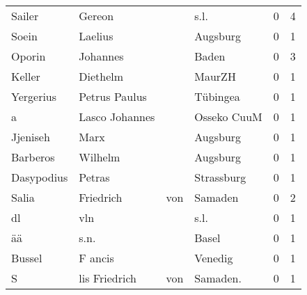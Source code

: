 \begin{center}
\begin{tiny}
\begin{longtabu}{llllrr}
                   Sailer &                             Gereon &             &                                        s.l. &          0 &         4 \\
                    Soein &                            Laelius &             &                                    Augsburg &          0 &         1 \\
                   Oporin &                           Johannes &             &                                       Baden &          0 &         3 \\
                   Keller &                           Diethelm &             &                                      MaurZH &          0 &         1 \\
                Yergerius &                      Petrus Paulus &             &                                    Tübingea &          0 &         1 \\
                        a &                     Lasco Johannes &             &                                 Osseko CuuM &          0 &         1 \\
                 Jjeniseh &                               Marx &             &                                    Augsburg &          0 &         1 \\
                 Barberos &                            Wilhelm &             &                                    Augsburg &          0 &         1 \\
               Dasypodius &                             Petras &             &                                  Strassburg &          0 &         1 \\
                    Salia &                          Friedrich &         von &                                     Samaden &          0 &         2 \\
                       dl &                                vln &             &                                        s.l. &          0 &         1 \\
                       ää &                               s.n. &             &                                       Basel &          0 &         1 \\
                   Bussel &                            F ancis &             &                                     Venedig &          0 &         1 \\
                        S &                      lis Friedrich &         von &                                   Samaden.  &          0 &         1 \\

\end{longtabu}
\end{tiny}
\end{center}
